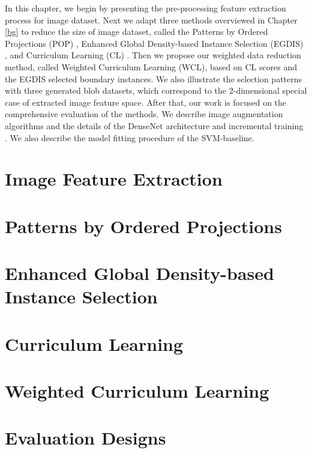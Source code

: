 In this chapter, we begin by presenting the pre-processing feature extraction process for image dataset. Next we adapt three methods overviewed in Chapter \ref{bg} to reduce the size of image dataset, called the Patterns by Ordered Projections (POP) \cite{Riquelme2003a}, Enhanced Global Density-based Instance Selection (EGDIS) \cite{Malhat2020}, and Curriculum Learning (CL) \cite{Hacohen2019a}. Then we propose our weighted data reduction method, called Weighted Curriculum Learning (WCL), based on CL scores and the EGDIS selected boundary instances. We also illustrate the selection patterns with three generated blob datasets, which correspond to the 2-dimensional special case of extracted image feature space. After that, our work is focused on the comprehensive evaluation of the methods. We describe image augmentation algorithms and the details of the DenseNet architecture \cite{Huang2017} and incremental training \cite{Istrate2017}. We also describe the model fitting procedure of the SVM-baseline.

\section{Image Feature Extraction}


\section{Patterns by Ordered Projections}

\section{Enhanced Global Density-based Instance Selection}
\section{Curriculum Learning}
\section{Weighted Curriculum Learning}
\section{Evaluation Designs}